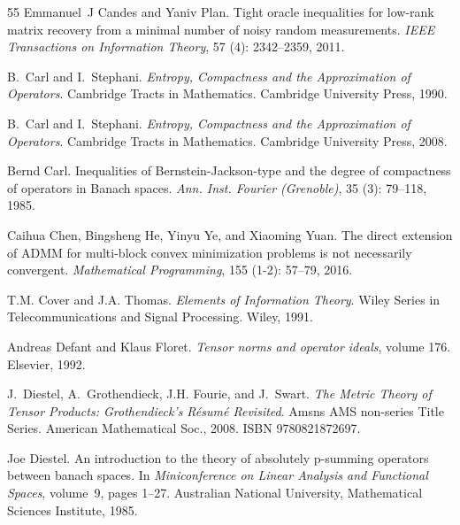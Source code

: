 \documentclass[11pt]{article}
\begin{document}
\begin{thebibliography}{55}
Emmanuel~J Candes and Yaniv Plan.
\newblock Tight oracle inequalities for low-rank matrix recovery from a minimal
  number of noisy random measurements.
\newblock \emph{IEEE Transactions on Information Theory}, 57
  (4): 2342--2359, 2011.

B.~Carl and I.~Stephani.
\newblock \emph{Entropy, Compactness and the Approximation of Operators}.
\newblock Cambridge Tracts in Mathematics. Cambridge University Press, 1990.

B.~Carl and I.~Stephani.
\newblock \emph{Entropy, Compactness and the Approximation of Operators}.
\newblock Cambridge Tracts in Mathematics. Cambridge University Press, 2008.

Bernd Carl.
\newblock Inequalities of {B}ernstein-{J}ackson-type and the degree of
  compactness of operators in {B}anach spaces.
\newblock \emph{Ann. Inst. Fourier (Grenoble)}, 35 (3):
  79--118, 1985.

Caihua Chen, Bingsheng He, Yinyu Ye, and Xiaoming Yuan.
\newblock The direct extension of {ADMM} for multi-block convex minimization
  problems is not necessarily convergent.
\newblock \emph{Mathematical Programming}, 155 (1-2): 57--79,
  2016.

T.M. Cover and J.A. Thomas.
\newblock \emph{Elements of Information Theory}.
\newblock Wiley Series in Telecommunications and Signal Processing. Wiley,
  1991.

Andreas Defant and Klaus Floret.
\newblock \emph{Tensor norms and operator ideals}, volume 176.
\newblock Elsevier, 1992.

J.~Diestel, A.~Grothendieck, J.H. Fourie, and J.~Swart.
\newblock \emph{The Metric Theory of Tensor Products: Grothendieck's
  R{\'e}sum{\'e} Revisited}.
\newblock Amsns AMS non-series Title Series. American Mathematical Soc., 2008.
\newblock ISBN 9780821872697.

Joe Diestel.
\newblock An introduction to the theory of absolutely p-summing operators
  between banach spaces.
\newblock In \emph{Miniconference on Linear Analysis and Functional Spaces},
  volume~9, pages 1--27. Australian National University, Mathematical Sciences
  Institute, 1985.


\end{thebibliography}
\end{document}

